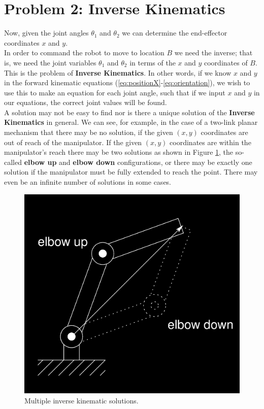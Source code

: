 \section*{Problem 2: Inverse Kinematics} \label{Sec: Problem 2: Inverse Kinematics}


Now, given the joint angles $\theta_1$ and $\theta_2$ we can determine the end-effector coordinates $x$ and $y$.\\
In order to command the robot to move to location $B$ we need the inverse; that is, we need
the joint variables $\theta_1$ and $\theta_2$ in terms of the $x$ and $y$ coordinates of $B$.
This is the problem of \textbf{Inverse Kinematics}. In other words, if we know $x$ and $y$ in the forward kinematic equations
(\ref{eq:positionX}-\ref{eq:orientation}), we wish to use this to make an equation for each joint angle, such that if we input $x$ and $y$
in our equations, the correct joint values will be found.\\
A solution may not be easy to find nor is there a unique solution of the \textbf{Inverse Kinematics} in general.
We can see, for example, in the case of a two-link planar mechanism that there may be no
solution, if the given $(x,y)$ coordinates are out of reach of the manipulator.
If the given $(x,y)$ coordinates are within the manipulator’s reach there may be two solutions as shown
in Figure \ref{fig:Figure1_26}, the so-called \textbf{elbow up} and \textbf{elbow down} configurations, or there may be
exactly one solution if the manipulator must be fully extended to reach the point. There
may even be an infinite number of solutions in some cases.

\begin{figure}[H]
	\centering
	\includegraphics[width=1\textwidth]{img/Figure1_26.png}
	\caption{Multiple inverse kinematic solutions.}
	\label{fig:Figure1_26}
\end{figure}

